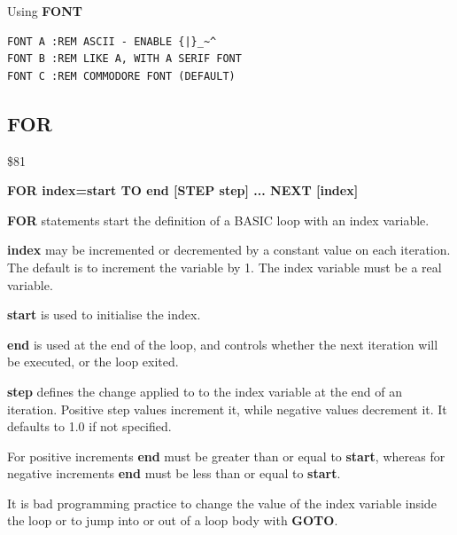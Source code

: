 \begin{description}[leftmargin=2cm,style=nextline]
\item [Examples:] Using {\bf FONT}
\begin{tcolorbox}[colback=black,coltext=white]
\begin{verbatim}
FONT A :REM ASCII - ENABLE {|}_~^
FONT B :REM LIKE A, WITH A SERIF FONT
FONT C :REM COMMODORE FONT (DEFAULT)
\end{verbatim}
\end{tcolorbox}
\end{description}


\newpage
\subsection{FOR}
\begin{description}[leftmargin=2cm,style=nextline]
\item [Token:] \$81
\item [Format:] {\bf FOR index=start TO end [STEP step] ... NEXT [index]}
\item [Usage:] {\bf FOR} statements start the definition
               of a BASIC loop with an index variable.

               {\bf index} may be incremented or decremented
               by a constant value on each iteration. The default
               is to increment the variable by 1.
               The index variable must be a real variable.

               {\bf start} is used to initialise the index.

               {\bf end} is used at the end of the loop,
               and controls whether the next iteration will be executed,
               or the loop exited.

               {\bf step} defines the change applied to
               to the index variable at the end of an iteration.
               Positive step values increment it, while negative values
               decrement it. It defaults to 1.0 if not specified.

\item [Remarks:] For positive increments {\bf end} must be greater than
               or equal to {\bf start}, whereas for negative increments
               {\bf end} must be less than or equal to {\bf start}.

               It is bad programming practice to change the value
               of the index variable inside the loop or to
               jump into or out of a loop body with {\bf GOTO}.


\end{description}
